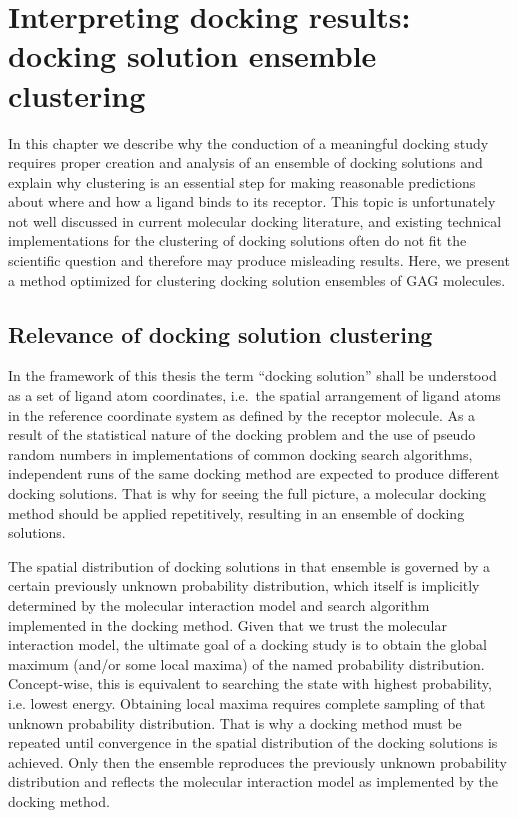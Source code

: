 \chapter{Interpreting docking results: docking solution ensemble clustering}

In this chapter we describe why the conduction of a meaningful docking study
requires proper creation and analysis of an ensemble of docking solutions and
explain why clustering is an essential step for making reasonable predictions
about where and how a ligand binds to its receptor. This topic is unfortunately
not well discussed in current molecular docking literature, and existing
technical implementations for the clustering of docking solutions often do not
fit the scientific question and therefore may produce misleading results. Here,
we present a method optimized for clustering docking solution ensembles of GAG
molecules.

\section{Relevance of docking solution clustering}

In the framework of this thesis the term \enquote{docking solution} shall be
understood as a set of ligand atom coordinates, i.e.\ the spatial arrangement of
ligand atoms in the reference coordinate system as defined by the receptor
molecule. As a result of the statistical nature of the docking problem and the
use of pseudo random numbers in implementations of common docking search
algorithms, independent runs of the same docking method are expected to produce
different docking solutions. That is why for seeing the full picture, a
molecular docking method should be applied repetitively, resulting in an
ensemble of docking solutions.

The spatial distribution of docking solutions in that ensemble is governed by a
certain previously unknown probability distribution, which itself is implicitly
determined by the molecular interaction model and search algorithm implemented
in the docking method. Given that we trust the molecular interaction model, the
ultimate goal of a docking study is to obtain the global maximum (and/or some
local maxima) of the named probability distribution. Concept-wise, this is
equivalent to searching the state with highest probability, i.e. lowest energy.
Obtaining local maxima requires complete sampling of that unknown probability
distribution. That is why a docking method must be repeated until convergence
in the spatial distribution of the docking solutions is achieved. Only then the
ensemble reproduces the previously unknown probability distribution and reflects
the molecular interaction model as implemented by the docking method.

